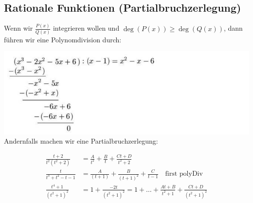 \documentclass[25pt]{sciposter}
\begin{document}
\begin{multicols}{3}

\subsection*{Rationale Funktionen (Partialbruchzerlegung)}

Wenn wir $\frac{P(x)}{Q(x)}$ integrieren wollen und $\deg(P(x)) \geq \deg(Q(x))$, dann führen wir eine Polynomdivision durch:

\includegraphics[width=0.7\linewidth]{img/polyDiv.png}\\
Andernfalls machen wir eine Partialbruchzerlegung:

\begin{align*}
	\frac{t+2}{t^2(t^2 + 2)} &= \frac{A}{t^2} + \frac{B}{t} + \frac{Ct + D}{t^2 + 2}\\
	\frac{t}{t^3 + t^2 - t - 1} &= \frac{A}{(t+1)} + \frac{B}{(t+1)^2} + \frac{C}{t-1} \quad \text{first polyDiv}\\
	\frac{t^4 + 1}{(t^2 + 1)^2} &= 1 + \frac{-2t}{(t^2 + 1)^2} = 1 + \ldots + \frac{At + B}{t^2 + 1} + \frac{Ct + D}{(t^2 + 1)^2}
\end{align*}



\vfill\null
\columnbreak



\end{multicols}
\end{document}
